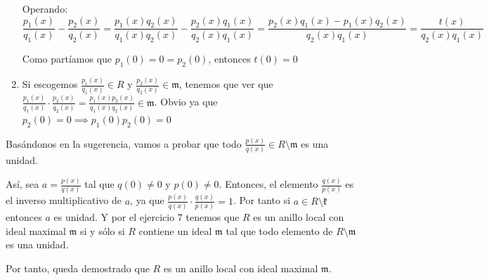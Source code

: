 \begin{problem}
\begin{enumerate}
	Operando:
	$$\frac{p_1(x)}{q_1(x)}- \frac{p_2(x)}{q_2(x)} = \frac{p_1(x)q_2(x)}{q_1(x)q_2(x)}- \frac{p_2(x)q_1(x)}{q_2(x)q_1(x)}=\frac{p_2(x)q_1(x)-p_1(x)q_2(x)}{q_2(x)q_1(x)}=\frac{t(x)}{q_2(x)q_1(x)}$$

	Como partíamos que $p_1(0)=0=p_2(0)$, entonces $t(0)=0$
	\item Si escogemos $\frac{p_1(x)}{q_1(x)} \in R$ y $\frac{p_2(x)}{q_2(x)} \in \mathfrak{m}$, tenemos que ver que $\frac{p_1(x)}{q_1(x)}\cdot \frac{p_2(x)}{q_2(x)} = \frac{p_1(x)p_2(x)}{q_1(x)q_2(x)} \in \mathfrak{m}$. Obvio ya que $p_2(0)=0 \implies p_1(0)p_2(0) = 0$
\end{enumerate}

\spart
Basándonos en la sugerencia, vamos a probar que todo $ \frac{p(x)}{q(x)} \in R \setminus \mathfrak{m} $ es una unidad.

Así, sea $a=\frac{p(x)}{q(x)}$ tal que $q(0) \neq 0$ y $p(0) \neq 0$. Entonces, el elemento $\frac{q(x)}{p(x)}$ es el inverso multiplicativo de $a$, ya que $\frac{p(x)}{q(x)}\cdot \frac{q(x)}{p(x)}=1$. Por tanto si $a \in R \setminus \mathfrak{k}$ entonces $a$ es unidad. Y por el ejercicio 7 tenemos que $R$ es un anillo local con ideal maximal $\mathfrak m$ si y sólo si $R$ contiene un ideal $\mathfrak m$ tal que todo elemento de $R\setminus \mathfrak m$ es una unidad.

Por tanto, queda demostrado que $R$ es un anillo local con ideal maximal $\mathfrak m$.

\end{problem}


